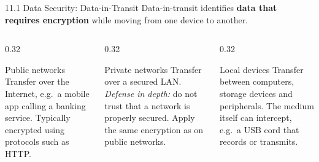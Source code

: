 \documentclass[11pt,aspectratio=169]{beamer}
\newcommand{\kw}[1]{\textbf{\color{accent}#1}}
\begin{document}
\begin{frame}{11.1 Data Security: Data-in-Transit}
  \small
  Data-in-transit identifies \kw{data that requires encryption} while moving
  from one device to another.
  \vspace{0.9em}

  \begin{columns}[T,onlytextwidth]
    \begin{column}{0.32\textwidth}
      \begin{block}{Public networks}
        \scriptsize
        Transfer over the Internet, e.g.\ a mobile app calling a banking
        service. Typically encrypted using protocols such as HTTP.
      \end{block}
    \end{column}
    \begin{column}{0.32\textwidth}
      \begin{block}{Private networks}
        \scriptsize
        Transfer over a secured LAN. \emph{Defense in depth:} do not trust that
        a network is properly secured. Apply the same encryption as on public
        networks.
      \end{block}
    \end{column}
    \begin{column}{0.32\textwidth}
      \begin{block}{Local devices}
        \scriptsize
        Transfer between computers, storage devices and peripherals. The medium
        itself can intercept, e.g.\ a USB cord that records or transmits.
      \end{block}
    \end{column}
  \end{columns}
\end{frame}
\end{document}
